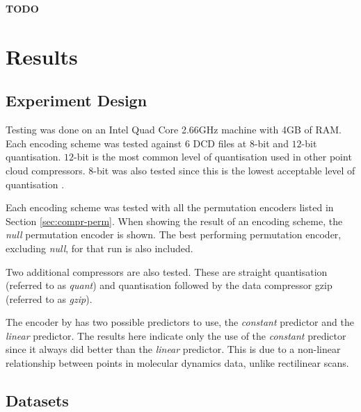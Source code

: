 \documentclass[a4paper]{report}
\newcommand{\todo}{\textbf{TODO} }
\begin{document}
\todo


\chapter{Results}

\section{Experiment Design}

Testing was done on an Intel Quad Core 2.66GHz machine with 4GB of RAM. Each
encoding scheme was tested against 6 DCD files at $8$-bit and $12$-bit
quantisation. $12$-bit is the most common level of quantisation used in other
point cloud compressors. $8$-bit was also tested since this is the lowest
acceptable level of quantisation \citep{minvis}.

Each encoding scheme was tested with all the permutation encoders listed in
Section \ref{sec:compr-perm}. When showing the result of an encoding scheme,
the \emph{null} permutation encoder is shown. The best performing permutation
encoder, excluding \emph{null}, for that run is also included.

Two additional compressors are also tested. These are straight quantisation
(referred to as \emph{quant}) and quantisation followed by the data compressor
gzip (referred to as \emph{gzip}).

The encoder by \citet{gumholdcomp} has two possible predictors to use, the
\emph{constant} predictor and the \emph{linear} predictor. The results here
indicate only the use of the \emph{constant} predictor since it always did
better than the \emph{linear} predictor. This is due to a non-linear
relationship between points in molecular dynamics data, unlike rectilinear
scans.

\section{Datasets}
\end{document}
